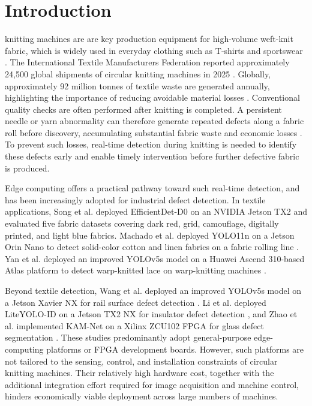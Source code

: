 \documentclass[journal]{IEEEtran}
\begin{document}
\section{Introduction}
 knitting machines are are key production equipment for high-volume weft-knit fabric, which is widely used in everyday clothing such as T-shirts and sportswear \cite{cottonworksKnitBasics,woolmarkCircularKnitting,cottonworksSingleDouble}. The International Textile Manufacturers Federation reported approximately 24,500 global shipments of circular knitting machines in 2025 \cite{itmf2025press}. Globally, approximately 92 million tonnes of textile waste are generated annually, highlighting the importance of reducing avoidable material losses \cite{unep2025textilewaste}. Conventional quality checks are often performed after knitting is completed. A persistent needle or yarn abnormality can therefore generate repeated defects along a fabric roll before discovery, accumulating substantial fabric waste and economic losses \cite{takeuchi2018knitted,akter2022material,xiang2023hooknet}. To prevent such losses, real-time detection during knitting is needed to identify these defects early and enable timely intervention before further defective fabric is produced.

Edge computing offers a practical pathway toward such real-time detection, and has been increasingly adopted for industrial defect detection. In textile applications, Song et al. deployed EfficientDet-D0 on an NVIDIA Jetson TX2 and evaluated five fabric datasets covering dark red, grid, camouflage, digitally printed, and light blue fabrics\cite{song2021edgefabric}. Machado et al. deployed YOLO11n on a Jetson Orin Nano to detect solid-color cotton and linen fabrics on a fabric rolling line \cite{machado2025edgefabric}. Yan et al. deployed an improved YOLOv5s model on a Huawei Ascend 310-based Atlas platform to detect warp-knitted lace on warp-knitting machines \cite{yan2026warplace}.

Beyond textile detection, Wang et al. deployed an improved YOLOv5s model on a Jetson Xavier NX for rail surface defect detection \cite{wang2024rail}. Li et al. deployed LiteYOLO-ID on a Jetson TX2 NX for insulator defect detection \cite{li2024liteyolo}, and Zhao et al. implemented KAM-Net on a Xilinx ZCU102 FPGA for glass defect segmentation \cite{zhao2025kamnet}. These studies predominantly adopt general-purpose edge-computing platforms or FPGA development boards. However, such platforms are not tailored to the sensing, control, and installation constraints of circular knitting machines. Their relatively high hardware cost, together with the additional integration effort required for image acquisition and machine control, hinders economically viable deployment across large numbers of machines.
\end{document}
